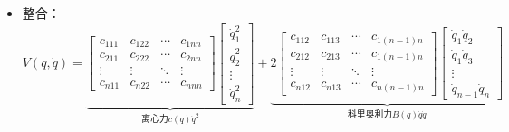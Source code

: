 \documentclass[
12pt, %
a4paper, 
oneside, %
headinclude,footinclude, %
]{scrartcl}
\begin{document}
\begin{itemize}
故：
{\footnotesize
$$
\textcolor{blue}{\begin{bmatrix} \dot{q}^T\frac{\partial M(q)}{\partial q_1}\dot{q} \\ \vdots \\ \dot{q}^T\frac{\partial M(q)}{\partial q_n}\dot{q} \end{bmatrix}} 
= \begin{bmatrix} b_{1,1,1} & b_{2,2,1} & \cdots & b_{n,n,1} \\ b_{1,1,2} & b_{2,2,2} & \cdots & b_{n,n,2} \\ \vdots & \vdots & \ddots & \vdots \\ b_{1,1,n} & b_{2,2,n} & \cdots & b_{n,n,n} \end{bmatrix}
\begin{bmatrix} \dot{q}_1^2 \\ \dot{q}_2^2 \\ \vdots \\ \dot{q}_n^2 \end{bmatrix}
+ 2\begin{bmatrix} b_{1,2,1} & b_{1,3,1} & \cdots & b_{n-1,n,1} \\ b_{1,2,2} & b_{1,3,2} & \cdots & b_{n-1,n,2} \\ \vdots & \vdots & \ddots & \vdots \\ b_{1,2,n} & b_{1,3,n} & \cdots & b_{n - 1,n,n} \end{bmatrix}_{n \times \frac{n^2 - n}{2}}
\begin{bmatrix} \dot{q}_1\dot{q}_2 \\ \dot{q}_1\dot{q}_3 \\ \vdots \\ \dot{q}_{n-1}\dot{q}_n \end{bmatrix}_{\frac{n^2 - n}{2}}
$$
}
\item 整合：
$$
V(q,\dot{q}) = 
\underbrace{\begin{bmatrix} c_{111} & c_{122} & \cdots & c_{1nn} \\ c_{211} & c_{222} & \cdots & c_{2nn} \\ \vdots & \vdots & \ddots & \vdots \\ c_{n11} & c_{n22} & \cdots & c_{nnn} \end{bmatrix} \begin{bmatrix} \dot{q}_1^2 \\ \dot{q}_2^2 \\ \vdots \\ \dot{q}_n^2 \end{bmatrix}}_{\text{离心力}c(q)\dot{q}^2}
+ \underbrace{2\begin{bmatrix} c_{112} & c_{113} & \cdots & c_{1(n - 1)n} \\ c_{212} & c_{213} & \cdots & c_{1(n - 1)n} \\ \vdots & \vdots & \ddots & \vdots \\ c_{n12} & c_{n13} & \cdots & c_{n(n - 1)n} \end{bmatrix} \begin{bmatrix} \dot{q}_1\dot{q}_2 \\ \dot{q}_1\dot{q}_3 \\ \vdots \\ \dot{q}_{n - 1}\dot{q}_n \end{bmatrix}}_{\text{科里奥利力}B(q)\dot{q}\dot{q}}
$$
\end{itemize}
\end{document}
